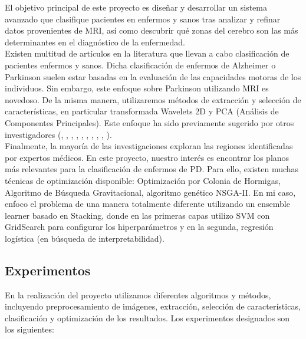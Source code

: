 El objetivo principal de este proyecto es diseñar y desarrollar un sistema avanzado que clasifique pacientes en enfermos y sanos tras analizar y refinar datos provenientes de MRI, así como descubrir qué zonas del cerebro son las más determinantes en el diagnóstico de la enfermedad. \\

Existen multitud de artículos en la literatura que llevan a cabo clasificación de pacientes enfermos y sanos. Dicha clasificación de enfermos de Alzheimer o Parkinson suelen estar basadas en la evaluación de las capacidades motoras de los individuos. Sin embargo, este enfoque sobre Parkinson utilizando MRI es novedoso. De la misma manera, utilizaremos métodos de extracción y selección de características, en particular transformada Wavelets 2D y PCA (Análisis de Componentes Principales). Este enfoque ha sido previamente sugerido por otros investigadores (\cite{aggarwal}, \cite{iman}, \cite{deepa}, \cite{mohd}, \cite{rajesh}, \cite{michel}, \cite{jing}, \cite{yudong}, \cite{irojas}, \cite{alberto}). \\

Finalmente, la mayoría de las investigaciones exploran las regiones identificadas por expertos médicos. En este proyecto, nuestro interés es encontrar los planos más relevantes para la clasificación de enfermos de PD. Para ello, existen muchas técnicas de optimización disponible: Optimización por Colonia de Hormigas, Algoritmo de Búsqueda Gravitacional, algoritmo genético NSGA-II. En mi caso, enfoco el problema de una manera totalmente diferente utilizando un ensemble learner basado en Stacking, donde en las primeras capas utilizo SVM con GridSearch para configurar los hiperparámetros y en la segunda, regresión logística (en búsqueda de interpretabilidad).

\subsection{Experimentos}

En la realización del proyecto utilizamos diferentes algoritmos y métodos, incluyendo preprocesamiento de imágenes, extracción, selección de características, clasificación y optimización de los resultados. Los experimentos designados son los siguientes:

